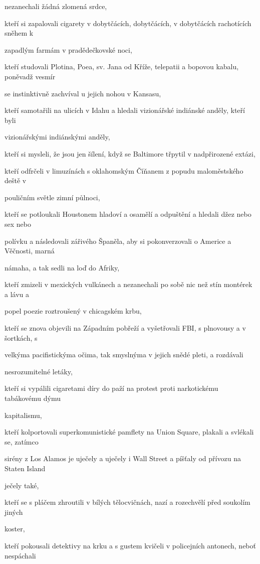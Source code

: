 \documentclass[11pt]{article}
\begin{document}
\begin{center}
nezanechali žádná zlomená srdce,

kteří si zapalovali cigarety v dobytčácích, dobytčácích, v dobytčácích rachotících sněhem k

zapadlým farmám v pradědečkovské noci,

kteří studovali Plotina, Poea, sv. Jana od Kříže, telepatii a bopovou kabalu, poněvadž vesmír

se instinktivně zachvíval u jejich nohou v Kansasu,

kteří samotařili na ulicích v Idahu a hledali vizionářské indiánské anděly, kteří byli

vizionářskými indiánskými anděly,

kteří si mysleli, že jsou jen šílení, když se Baltimore třpytil v nadpřirozené extázi,

kteří odfrčeli v limuzínách s oklahomským Číňanem z popudu maloměstského deště v

pouličním světle zimní půlnoci,

kteří se potloukali Houstonem hladoví a osamělí a odpuštění a hledali džez nebo sex nebo

polívku a následovali zářivého Španěla, aby si pokonverzovali o Americe a Věčnosti, marná

námaha, a tak sedli na loď do Afriky,

kteří zmizeli v mexických vulkánech a nezanechali po sobě nic než stín montérek a lávu a

popel poezie roztroušený v chicagském krbu,

kteří se znova objevili na Západním pobřeží a vyšetřovali FBI, s plnovousy a v šortkách, s

velkýma pacifistickýma očima, tak smyslnýma v jejich snědé pleti, a rozdávali

nesrozumitelné letáky,

kteří si vypálili cigaretami díry do paží na protest proti narkotickému tabákovému dýmu

kapitalismu,

kteří kolportovali superkomunistické pamflety na Union Square, plakali a svlékali se, zatímco

sirény z Los Alamos je uječely a uječely i Wall Street a píšťaly od přívozu na Staten Island

ječely také,

kteří se s pláčem zhroutili v bílých tělocvičnách, nazí a rozechvělí před soukolím jiných

koster,

kteří pokousali detektivy na krku a s gustem kvičeli v policejních antonech, neboť nespáchali


\end{center}
\end{document}
